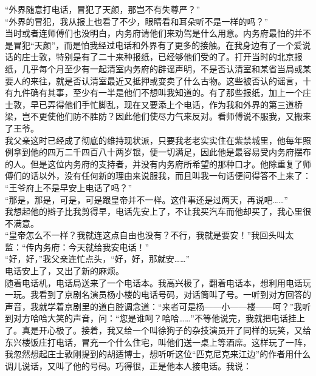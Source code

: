“外界随意打电话，冒犯了天颜，那岂不有失尊严？”\\

“外界的冒犯，我从报上也看了不少，眼睛看和耳朵听不是一样的吗？”\\

当时或者连师傅们也没明白，内务府请他们来劝驾是什么用意。内务府最怕的并不是冒犯“天颜”，而是怕我经过电话和外界有了更多的接触。在我身边有了一个爱说话的庄士敦，特别是有了二十来种报纸，已经够他们受的了。打开当时的北京报纸，几乎每个月至少有一起清室内务府的辟谣声明，不是否认清室和某省当局或某要人的来往，就是否认清室最近又抵押或变卖了什么古物。这些被否认的谣言，十有九件确有其事，至少有一半是他们不想叫我知道的。有了那些报纸，加上一个庄士敦，早已弄得他们手忙脚乱，现在又要添上个电话，作为我和外界的第三道桥梁，岂不更使他们防不胜防？因此他们使尽力气来反对。看师傅说不服我，又搬来了王爷。\\

我父亲这时已经成了彻底的维持现状派，只要我老老实实住在紫禁城里，他每年照例拿到他的四万二千四百八十两岁银，便一切满足，因此他是最容易受内务府摆布的人。但是这位内务府的支持者，并没有内务府所希望的那种口才。他除重复了师傅们的话以外，没有任何新的理由来说服我，而且叫我一句话便问得答不上来了：\\

“王爷府上不是早安上电话了吗？”\\

“那是，那是，可是，可是跟皇帝并不一样。这件事还是过两天，再说吧……”\\

我想起他的辫子比我剪得早，电话先安上了，不让我买汽车而他却买了，我心里很不满意。\\

“皇帝怎么不一样？我就连这点自由也没有？不行，我就是要安！”我回头叫太监：“传内务府：今天就给我安电话！”\\

“好，好，”我父亲连忙点头，“好，好，那就安……”\\

电话安上了，又出了新的麻烦。\\

随着电话机，电话局送来了一个电话本。我高兴极了，翻着电话本，想利用电话玩一玩。我看到了京剧名演员杨小楼的电话号码，对话筒叫了号。一听到对方回答的声音，我就学着京剧里的道白腔调念道：“来者可是杨——小——楼——呵？”我听到对方哈哈大笑的声音，问：“您是谁呵？哈哈……”不等他说完，我就把电话挂上了。真是开心极了。接着，我又给一个叫徐狗子的杂技演员开了同样的玩笑，又给东兴楼饭庄打电话，冒充一个什么住宅，叫他们送一桌上等酒席。这样玩了一阵，我忽然想起庄士敦刚提到的胡适博士，想听听这位“匹克尼克来江边”的作者用什么调儿说话，又叫了他的号码。巧得很，正是他本人接电话。我说：\\

